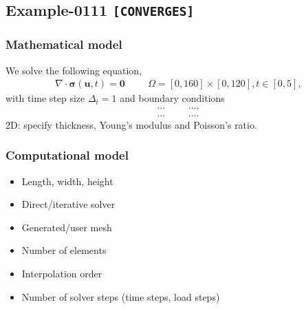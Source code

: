 %
\clearpage
%
\subsection{Example-0111 \texttt{[CONVERGES]}}
%
%
\subsubsection{Mathematical model}
%
We solve the following equation,
%
\begin{align}
    \nabla \cdot \boldsymbol{\sigma} (\boldsymbol{u}, t) = \boldsymbol{0} & &&\Omega = [0, 160] \times [0, 120], t \in [0, 5],
\end{align}
%
with time step size $\Delta_t = 1$ and boundary conditions
%
\begin{align}
    \ldots & && \ldots, \\
    \ldots & && \ldots.
\end{align}
%
2D: specify thickness, Young's modulus and Poisson's ratio.
%
%
\subsubsection{Computational model}
%
\begin{itemize}
    \item{Length, width, height}
    \item{Direct/iterative solver}
    \item{Generated/user mesh}
    \item{Number of elements}
    \item{Interpolation order}
    \item{Number of solver steps (time steps, load steps)}
\end{itemize}
%
%
